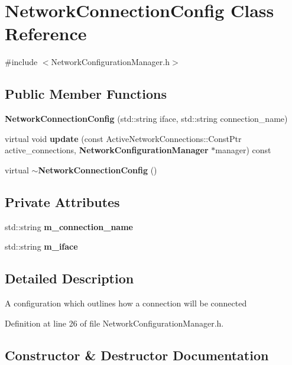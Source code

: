 \section{\-Network\-Connection\-Config \-Class \-Reference}
\label{classNetworkConnectionConfig}


{\ttfamily \#include $<$\-Network\-Configuration\-Manager.\-h$>$}

\subsection*{\-Public \-Member \-Functions}
\begin{DoxyCompactItemize}
\item 
{\bf \-Network\-Connection\-Config} (std\-::string iface, std\-::string connection\-\_\-name)
\item 
virtual void {\bf update} (const \-Active\-Network\-Connections\-::\-Const\-Ptr active\-\_\-connections, {\bf \-Network\-Configuration\-Manager} $\ast$manager) const 
\item 
virtual {\bf $\sim$\-Network\-Connection\-Config} ()
\end{DoxyCompactItemize}
\subsection*{\-Private \-Attributes}
\begin{DoxyCompactItemize}
\item 
std\-::string {\bf m\-\_\-connection\-\_\-name}
\item 
std\-::string {\bf m\-\_\-iface}
\end{DoxyCompactItemize}


\subsection{\-Detailed \-Description}
\-A configuration which outlines how a connection will be connected 

\-Definition at line 26 of file \-Network\-Configuration\-Manager.\-h.



\subsection{\-Constructor \& \-Destructor \-Documentation}
